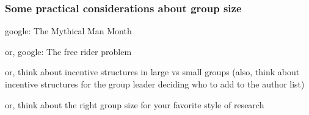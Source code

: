 \documentclass[12pt]{beamer}
\newcommand\gap{\vspace{5mm}}
\begin{document}
\begin{frame}





\end{frame}

\begin{frame}
\frametitle{ Some practical considerations about group size}

\vspace{1cm}

{
google: The Mythical Man Month

\gap

or, google: The free rider problem

\gap

or, think about incentive structures in large vs small groups (also, think about incentive structures for the group leader deciding who to add to the author list)

\gap

or, think about the right group size for your favorite style of research
}

\end{frame} 
\end{document}
